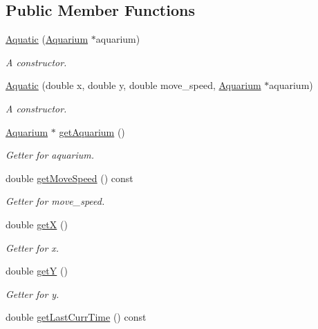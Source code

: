 \subsection*{Public Member Functions}
\begin{DoxyCompactItemize}
\item 
\mbox{\hyperlink{class_aquatic_a302075a7330fcdf17dc0fc50ae62ada8}{Aquatic}} (\mbox{\hyperlink{class_aquarium}{Aquarium}} $\ast$aquarium)
\begin{DoxyCompactList}\small\item\em A constructor. \end{DoxyCompactList}\item 
\mbox{\hyperlink{class_aquatic_a01426b7729415006ede2c6238fc5849e}{Aquatic}} (double x, double y, double move\+\_\+speed, \mbox{\hyperlink{class_aquarium}{Aquarium}} $\ast$aquarium)
\begin{DoxyCompactList}\small\item\em A constructor. \end{DoxyCompactList}\item 
\mbox{\hyperlink{class_aquarium}{Aquarium}} $\ast$ \mbox{\hyperlink{class_aquatic_aa84812ff8347a11345b9c8231c1375cc}{get\+Aquarium}} ()
\begin{DoxyCompactList}\small\item\em Getter for aquarium. \end{DoxyCompactList}\item 
double \mbox{\hyperlink{class_aquatic_a4153178bfefdc57cbcd05fe44054dac9}{get\+Move\+Speed}} () const
\begin{DoxyCompactList}\small\item\em Getter for move\+\_\+speed. \end{DoxyCompactList}\item 
double \mbox{\hyperlink{class_aquatic_ab59ba97a4876a0e3ae8b85c1915a82f9}{getX}} ()
\begin{DoxyCompactList}\small\item\em Getter for x. \end{DoxyCompactList}\item 
double \mbox{\hyperlink{class_aquatic_aadfede87649072d59192d923200b6fc3}{getY}} ()
\begin{DoxyCompactList}\small\item\em Getter for y. \end{DoxyCompactList}\item 
double \mbox{\hyperlink{class_aquatic_aba770b1c9ca9481712a6963e7e8e2919}{get\+Last\+Curr\+Time}} () const

\end{DoxyCompactItemize}

